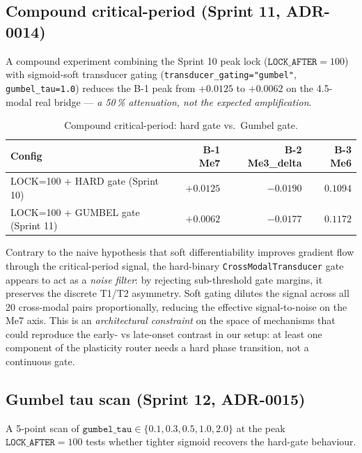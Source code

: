 \documentclass{article}
\begin{document}
\subsection{Compound critical-period (Sprint 11, ADR-0014)}

A compound experiment combining the Sprint 10 peak lock
($\mathtt{LOCK\_AFTER}=100$) with sigmoid-soft transducer gating
(\texttt{transducer\_gating="gumbel"},
\texttt{gumbel\_tau=1.0}) reduces the B-1 peak from $+0.0125$ to
$+0.0062$ on the 4.5-modal real bridge --- \emph{a 50\,\%
attenuation, not the expected amplification}.

\begin{table}[ht]
  \centering
  \caption{Compound critical-period: hard gate vs.\ Gumbel gate.}
  \label{tab:compound}
  \begin{tabular}{lrrr}
    \toprule
    Config & B-1 Me7 & B-2 Me3\_delta & B-3 Me6 \\
    \midrule
    LOCK=100 + HARD gate (Sprint 10) & $+0.0125$ & $-0.0190$ & $0.1094$ \\
    LOCK=100 + GUMBEL gate (Sprint 11) & $+0.0062$ & $-0.0177$ & $0.1172$ \\
    \bottomrule
  \end{tabular}
\end{table}

Contrary to the naive hypothesis that soft differentiability
improves gradient flow through the critical-period signal, the
hard-binary \texttt{CrossModalTransducer} gate appears to act as a
\emph{noise filter}: by rejecting sub-threshold gate margins, it
preserves the discrete T1/T2 asymmetry. Soft gating dilutes the
signal across all 20 cross-modal pairs proportionally, reducing
the effective signal-to-noise on the Me7 axis. This is an
\emph{architectural constraint} on the space of mechanisms that
could reproduce the early- vs late-onset contrast in our setup: at least one
component of the plasticity router needs a hard phase transition,
not a continuous gate.

\subsection{Gumbel tau scan (Sprint 12, ADR-0015)}

A 5-point scan of $\mathtt{gumbel\_tau} \in \{0.1, 0.3, 0.5, 1.0, 2.0\}$
at the peak $\mathtt{LOCK\_AFTER}=100$ tests whether tighter
sigmoid recovers the hard-gate behaviour.
\end{document}
